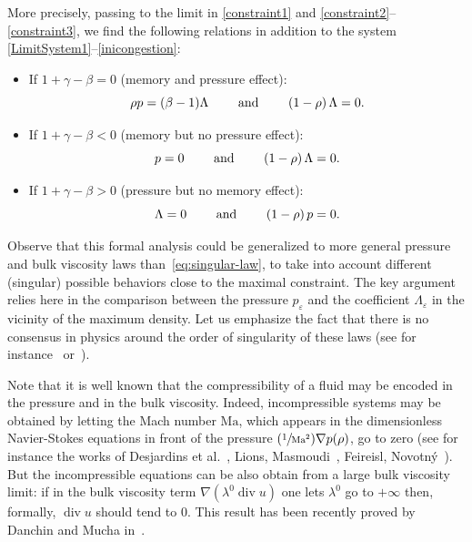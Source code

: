 \documentclass[JEP,XML,SOM,Unicode,NoEqCountersInSection]{cedram}
\newcommand{\<}{\bigl\langle}
\renewcommand{\>}{\bigr\rangle}
\newcommand{\Psfrac}[2]{(\sfrac{#1}{#2})}
\theoremstyle{definition}
\theoremstyle{remark}
\DeclareMathOperator{\Div}{div}
\let\ep\varepsilon
\begin{document}
More precisely, passing to the limit in \eqref{constraint1} and \eqref{constraint2}--\eqref{constraint3}, we find the following relations in addition to the system \eqref{LimitSystem1}--\eqref{inicongestion}:
\begin{itemize}
\item If $1+\gamma -\beta=0$ (memory and pressure effect):
\begin{equation}\label{MPE}
\rho p = (\beta-1) \Lambda \qquad \hbox{ and } \qquad (1-\rho) \, \Lambda=0.
\end{equation}
\item If $1+\gamma - \beta <0$ (memory but no pressure effect):
\begin{equation}\label{MPPE}
p = 0 \qquad \hbox{ and } \qquad
(1-\rho)\, \Lambda= 0.
\end{equation}
\item If $1+\gamma -\beta>0$ (pressure but no memory effect):
\begin{equation} \label{PPME}
\Lambda=0
\qquad \hbox{ and } \qquad (1-\rho) \, p = 0.
\end{equation}
\end{itemize}

Observe that this formal analysis could be generalized to more general pressure and bulk viscosity laws than~\eqref{eq:singular-law}, to take into account different (singular) possible behaviors close to the maximal constraint.
The key argument relies here in the comparison between the pressure $p_\ep$ and the coefficient $\Lambda_\ep$ in the vicinity of the maximum density.
Let us emphasize the fact that there is no consensus in physics around the order of singularity of these laws (see for instance~\cite{andreotti2013} or~\cite{coussot2005}).

Note that it is well known that the compressibility of a fluid may be encoded in the pressure and in the bulk viscosity.
Indeed, incompressible systems may be obtained by letting the Mach number $\mathrm{Ma}$, which appears in the dimensionless Navier-Stokes equations in front of the pressure $\Psfrac{1}{\mathrm{Ma^2}}\nabla p(\rho)$, go
to zero (see for instance the works of {Desjardins} et al.~\cite{desjardins1999}, {Lions, Masmoudi}~\cite{lions1998Mach}, {Feireisl, Novotn{\'y}}~\cite{feireisl2009}).
But the incompressible equations can be also obtain from a large bulk viscosity limit:
if in the bulk viscosity term $\nabla(\lambda^0\Div u)$ one lets $\lambda^0$ go to $+\infty$ then, formally, $\Div u$ should tend to $0$.
This result has been recently proved by {Danchin} and {Mucha} in~\cite{danchin2017}.
\end{document}

